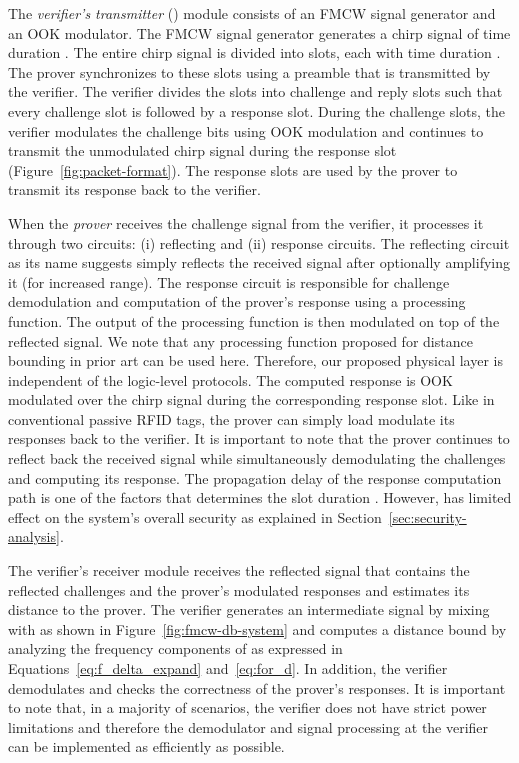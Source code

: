 \documentclass{sig-alternate-10pt}
\begin{document}
The \emph{verifier's transmitter} () module consists of an FMCW
signal generator and an OOK modulator. The FMCW signal generator generates a
chirp signal of time duration . The entire chirp signal is divided into
slots, each with time duration . The prover synchronizes to these slots
using a preamble that is transmitted by the verifier. The verifier divides the
slots into challenge and reply slots such that every challenge slot is followed
by a response slot. During the challenge slots, the verifier modulates the
challenge bits using OOK modulation and continues to transmit the unmodulated
chirp signal during the response slot (Figure~\ref{fig:packet-format}). The
response slots are used by the prover to transmit its response back to the
verifier. 

When the \emph{prover} receives the challenge signal  from the
verifier, it processes it through two circuits: (i) reflecting and (ii) response
circuits. The reflecting circuit as its name suggests simply reflects the
received signal  after optionally amplifying it (for increased
range). The response circuit is responsible for challenge demodulation and
computation of the prover's response using a processing function. The output of
the processing function is then modulated on top of the reflected signal. We
note that any processing function proposed for distance bounding in prior art
can be used here. Therefore, our proposed physical layer is independent of the
logic-level protocols. The computed response is OOK modulated over the chirp
signal during the corresponding response slot. Like in conventional passive RFID
tags, the prover can simply load modulate its responses back to the verifier. It
is important to note that the prover continues to reflect back the received
signal while simultaneously demodulating the challenges and computing its
response. The propagation delay of the response computation path is one of the
factors that determines the slot duration . However,  has limited
effect on the system's overall security as explained in
Section~\ref{sec:security-analysis}.

The verifier's receiver module receives the reflected signal 
that contains the reflected challenges and the prover's modulated responses and
estimates its distance to the prover. The verifier generates an intermediate
signal  by mixing  with  as shown in
Figure~\ref{fig:fmcw-db-system} and computes a distance bound by analyzing the
frequency components of  as expressed in
Equations~\eqref{eq:f_delta_expand} and~\eqref{eq:for_d}. In addition, the
verifier demodulates and checks the correctness of the prover's responses. It is
important to note that, in a majority of scenarios, the verifier does not have
strict power limitations and therefore the demodulator and signal processing at
the verifier can be implemented as efficiently as possible.
\end{document}
